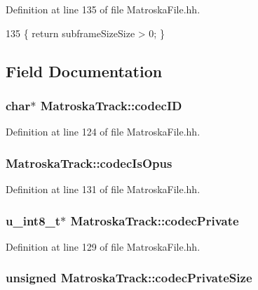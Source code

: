 Definition at line 135 of file Matroska\+File.\+hh.


\begin{DoxyCode}
135 \{ \textcolor{keywordflow}{return} subframeSizeSize > 0; \}
\end{DoxyCode}


\subsection{Field Documentation}
\subsubsection[{codec\+I\+D}]{\setlength{\rightskip}{0pt plus 5cm}char$\ast$ Matroska\+Track\+::codec\+I\+D}\label{classMatroskaTrack_a0058be599f3d4b92a935f20a41116003}


Definition at line 124 of file Matroska\+File.\+hh.

\subsubsection[{codec\+Is\+Opus}]{ Matroska\+Track\+::codec\+Is\+Opus}\label{classMatroskaTrack_a3c1ae5a6cb9f995559702f93bc22ccb6}


Definition at line 131 of file Matroska\+File.\+hh.

\subsubsection[{codec\+Private}]{\setlength{\rightskip}{0pt plus 5cm}u\+\_\+int8\+\_\+t$\ast$ Matroska\+Track\+::codec\+Private}\label{classMatroskaTrack_a096f9ecfc3c93b2085ea2fd955f7afde}


Definition at line 129 of file Matroska\+File.\+hh.

\subsubsection[{codec\+Private\+Size}]{\setlength{\rightskip}{0pt plus 5cm}unsigned Matroska\+Track\+::codec\+Private\+Size}\label{classMatroskaTrack_a64213681638ddde063f15daed2c0b5fc}


